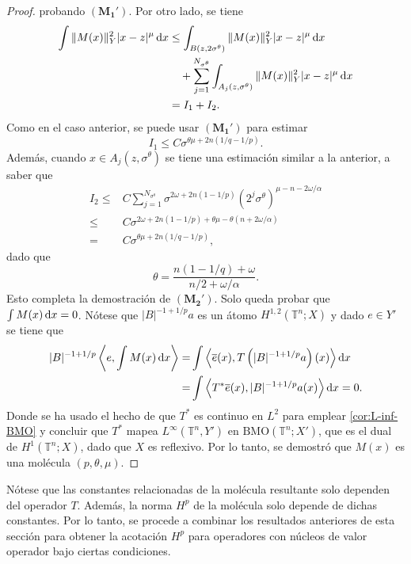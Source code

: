 \begin{proof}
	probando $(\mathbf{M_1'})$. Por otro lado, se tiene
	\begin{align*}
		\int \|M(x)\|_Y^2|x-z|^\mu \mathop{}\!\mathrm{d} x &\leq 
		\int_{B(z, 2\sigma^\theta)} \|M(x)\|_Y^2|x-z|^\mu \mathop{}\!\mathrm{d} x\\
		&  \quad + \sum_{j=1}^{N_{\sigma^\theta}} \int_{A_j(z, \sigma^\theta)} \|M(x)\|_Y^2|x-z|^\mu \mathop{}\!\mathrm{d} x \\
		 & = I_1 + I_2.
	\end{align*}
	Como en el caso anterior, se puede usar $(\mathbf{M_1'})$ para estimar 
	\begin{equation*}
		I_1 \leq C \sigma^{\theta\mu + 2n(1/q - 1/p)}.
	\end{equation*}
	Además, cuando $x \in A_j(z, \sigma^\theta)$ se tiene una estimación similar a la anterior, a saber que
	\begin{align*}
		I_2 \leq & C \sum_{j=1}^{N_{\sigma^\theta}} \sigma^{2\omega + 2n(1 - 1/p) } (2^j\sigma^\theta)^{\mu - n - 2\omega/\alpha} \\
		\leq & C \sigma^{ 2\omega + 2n(1-1/p) + \theta\mu -\theta(n + 2\omega/\alpha) } \\
		= & C\sigma^{ \theta\mu + 2n(1/q - 1/p) },
	\end{align*}
	dado que 
	\begin{equation*}
		\theta = \frac{n(1-1/q)+\omega}{ n/2 + \omega/\alpha }.
	\end{equation*}
	Esto completa la demostración de $(\mathbf{M_2'})$. Solo queda probar que $\int M(x)\mathop{}\!\mathrm{d} x=0$. Nótese que $|B|^{-1+1/p}a$  es un átomo $H^{1,2}(\mathbb{T}^n;X)$ y dado $e \in Y'$ se tiene que
	\begin{align*}
		|B|^{-1+1/p}\left\langle e, \int M(x)\mathop{}\!\mathrm{d} x \right\rangle =&  \int \left\langle \overline{e}(x) , T\left(  |B|^{-1+1/p}a\right)(x)\right\rangle \mathop{}\!\mathrm{d} x \\
		= & \int \left\langle T^*\overline{e}(x) ,   |B|^{-1+1/p}a(x)\right\rangle \mathop{}\!\mathrm{d} x = 0.
	\end{align*}
	Donde se ha usado el hecho de que $T^*$ es continuo en $L^2$ para emplear \cref{cor:L-inf-BMO} y concluir que $T^*$ mapea $L^\infty(\mathbb{T}^n, Y')$ en $\mathrm{BMO}(\mathbb{T}^n; X')$, que es el dual de $H^1(\mathbb{T}^n;X)$, dado que $X$ es reflexivo. Por lo tanto, se demostró que $M(x)$ es una molécula $(p, \theta,\mu)$.
\end{proof}
Nótese que las constantes relacionadas de la molécula resultante solo dependen del operador $T$. Además, la norma $H^p$ de la molécula solo depende de dichas constantes. Por lo tanto, se procede a combinar los resultados anteriores de esta sección para obtener la acotación $H^p$ para operadores con núcleos de valor operador bajo ciertas condiciones. 

